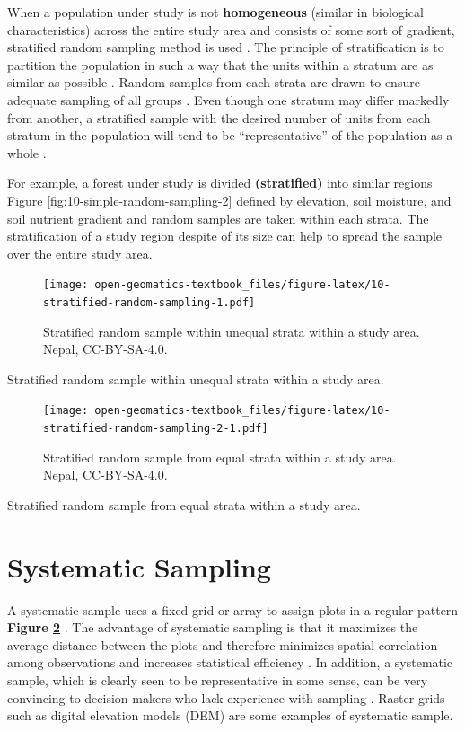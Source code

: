\documentclass[
]{book}
\begin{document}
When a population under study is not \textbf{homogeneous} (similar in biological characteristics) across the entire study area and consists of some sort of gradient, stratified random sampling method is used \citep{thompson_sampling_2012}. The principle of stratification is to partition the population in such a way that the units within a stratum are as similar as possible \citep{teddlie_mixed_2007}. Random samples from each strata are drawn to ensure adequate sampling of all groups \citep{teddlie_mixed_2007}. Even though one stratum may differ markedly from another, a stratified sample with the desired number of units from each stratum in the population will tend to be ``representative'' of the population as a whole \citep{howell_area_2020}.

For example, a forest under study is divided \textbf{(stratified)} into similar regions Figure \ref{fig:10-simple-random-sampling-2} defined by elevation, soil moisture, and soil nutrient gradient and random samples are taken within each strata. The stratification of a study region despite of its size can help to spread the sample over the entire study area.

\begin{figure}
\centering
\texttt{[image: open-geomatics-textbook\_files/figure-latex/10-stratified-random-sampling-1.pdf]}
\caption{\label{fig:10-stratified-random-sampling}Stratified random sample within unequal strata within a study area. Nepal, CC-BY-SA-4.0.}
\end{figure}

Stratified random sample within unequal strata within a study area.

\begin{figure}
\centering
\texttt{[image: open-geomatics-textbook\_files/figure-latex/10-stratified-random-sampling-2-1.pdf]}
\caption{\label{fig:10-stratified-random-sampling-2}Stratified random sample from equal strata within a study area. Nepal, CC-BY-SA-4.0.}
\end{figure}

Stratified random sample from equal strata within a study area.

\hypertarget{systematic-sampling}{%
\section{Systematic Sampling}\label{systematic-sampling}}

A systematic sample uses a fixed grid or array to assign plots in a regular pattern \textbf{Figure \ref{fig:10-stratified-random-sampling-2}} \citep{mcroberts_sampling_2014}. The advantage of systematic sampling is that it maximizes the average distance between the plots and therefore minimizes spatial correlation among observations and increases statistical efficiency \citep{mcroberts_sampling_2014}. In addition, a systematic sample, which is clearly seen to be representative in some sense, can be very convincing to decision-makers who lack experience with sampling \citep{mcroberts_sampling_2014}. Raster grids such as digital elevation models (DEM) are some examples of systematic sample.
\end{document}
